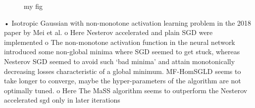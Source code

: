 \documentclass{article}
\begin{document}
\begin{figure}\centering
{}\hfill
{}\par 
{}
\caption{my fig}
\label{fig}
\end{figure}


•	Isotropic Gaussian with non-monotone activation learning problem in the 2018 paper by Mei et al.
o	Here Nesterov accelerated and plain SGD were implemented
o	The non-monotone activation function in the neural network introduced some non-global minima where SGD seemed to get stuck, whereas Nesterov SGD seemed to avoid such ‘bad minima’ and attain monotonically decreasing losses characteristic of a global minimum. MF-HomSGLD seems to take longer to converge, maybe the hyper-parameters of the algorithm are not optimally tuned.
o	Here The MaSS algorithm seems to outperform the Nesterov accelerated sgd only in later iterations
 
\end{document}
